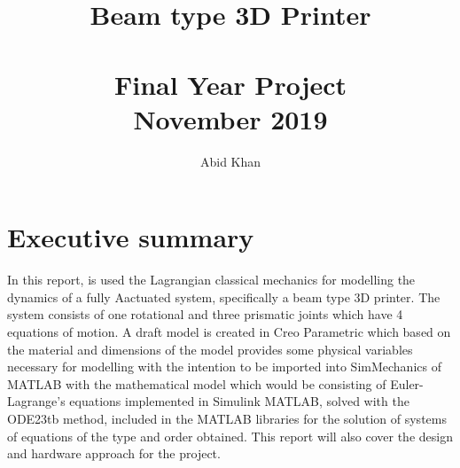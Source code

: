 \documentclass{UoNMCHA}
\numberwithin{equation}{section}
\begin{document}
\title{Beam type 3D Printer \\ \ \\
{\small Final Year Project  \\November 2019}}
\author[UoNMCHA]{Abid Khan}
\address[UoNMCHA]{
Student of Mechatronics Engineering,\\
The University of Newcastle, Callaghan, NSW 2308, AUSTRALIA \\
Student Number: 3189548 \\
E-mail: \href{mailtoc3189548@uon.edu.au}{\textsf{c3189548@uon.edu.au}}}
\maketitle
\onecolumn

\vspace{-5mm}
\section*{Executive summary}
In this report, is used the Lagrangian classical mechanics for modelling the dynamics of a fully Aactuated system, specifically a beam type 3D printer. The system consists of one rotational and three prismatic joints which have 4 equations of motion. A draft model is created in Creo Parametric which based on the material and dimensions of the model provides some physical variables necessary for modelling with the intention to be imported into SimMechanics of MATLAB with the mathematical model which would be consisting of Euler-Lagrange’s equations implemented in Simulink MATLAB, solved with the ODE23tb method, included in the MATLAB libraries for the solution of systems of equations of the type and order obtained. This report will also cover the design and hardware approach for the project.

\end{document}
